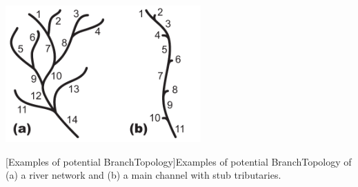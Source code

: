 \documentclass[11pt,a4paper]{article}
\begin{document}
\vspace*{2mm}
\begin{center}
\includegraphics[width=7.5cm]{BranchTopology}
\end{center}
{[Examples of potential BranchTopology]{Examples of potential BranchTopology of (a) a river network and (b) a main channel with stub tributaries.} \label{BranchTopologyFigure}}
\end{document}

